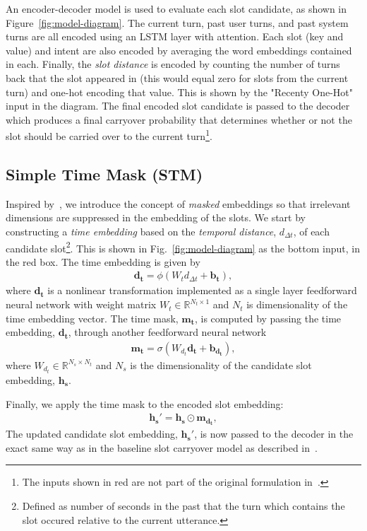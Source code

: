 \documentclass[11pt,a4paper]{article}
\begin{document}
An encoder-decoder model is used to evaluate each slot candidate, as shown in Figure~\ref{fig:model-diagram}. The current turn, past user turns, and past system turns are all encoded using an LSTM layer with attention. Each slot (key and value) and intent are also encoded by averaging the word embeddings contained in each. Finally, the \textit{slot distance} is encoded by counting the number of turns back that the slot appeared in (this would equal zero for slots from the current turn) and one-hot encoding that value. This is shown by the "Recenty One-Hot" input in the diagram. The final encoded slot candidate is passed to the decoder which produces a final carryover probability that determines whether or not the slot should be carried over to the current turn\footnote{The inputs shown in red are not part of the original formulation in~\citep{cc-inter}.}.


\subsection{Simple Time Mask (STM)}
\label{sssec:tm-s}

Inspired by~\cite{time-mask}, we introduce the concept of \textit{masked} embeddings so that irrelevant dimensions are suppressed in the embedding of the slots. 
We start by constructing a \textit{time embedding} based on the \textit{temporal distance}, $d_{\Delta t}$, of each candidate slot\footnote{
Defined as number of seconds in the past that the turn which contains the slot occured relative to the current utterance.}.
This is shown in Fig.~\ref{fig:model-diagram} as the bottom input, in the red box.
The time embedding is given by
\begin{eqnarray}
\label{eq:time-embedding}
\bm{d_t}=\phi(W_t d_{\Delta t} + \bm{b_t}),
\end{eqnarray}
where $\bm{d_t}$ is a nonlinear transformation implemented as a single layer feedforward neural network with weight matrix $W_t \in \mathbb{R}^{N_t \times 1}$ and $N_t$ is 
dimensionality of the time embedding vector. The time mask, $\bm{m_t}$, is computed by passing the time embedding, $\bm{d_t}$, through another feedforward neural network
\begin{eqnarray}
\label{eq:time-mask}
\bm{m_t}=\sigma(W_{d_t} \bm{d_t} + \bm{b_{d_t}}),
\end{eqnarray}
where $W_{d_t} \in \mathbb{R}^{N_s \times N_t}$ and $N_s$ is the dimensionality of the candidate slot embedding, $\bm{h_s}$.

Finally, we apply the time mask to the encoded slot embedding:
\begin{eqnarray}
\label{eq:masked-slot-embedding}
\bm{h_s'}=\bm{h_s} \odot \bm{m_{d_t}},
\end{eqnarray}
The updated candidate slot embedding, $\bm{h_s'}$, is now passed to the decoder in the exact same way as in the baseline slot carryover model as described in~\cite{cc-inter}.
\end{document}
